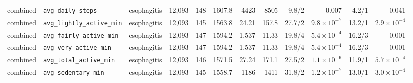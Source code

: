 \documentclass[11pt]{article}
\newcommand{\code}[1]{\texttt{\small #1}}
\begin{document}
\begin{longtable}{@{}p{1.4cm}p{2.9cm}p{1.7cm}rrrr rrrr r@{}}
combined & \code{avg\_daily\_steps} & esophagitis & 12{,}093 & 148 & 1607.8 &  4423 &  8505 & 9.8/2 & 0.007 & 4.2/1 & 0.041 \\
combined & \code{avg\_lightly\_active\_min} & esophagitis & 12{,}093 & 145 & 1563.8 & 24.21 & 157.8 & 27.7/2 & $9.8\times10^{-7}$ & 13.2/1 & $2.9\times10^{-4}$ \\
combined & \code{avg\_fairly\_active\_min} & esophagitis & 12{,}093 & 147 & 1594.2 & 1.537 & 11.33 & 19.8/4 & $5.4\times10^{-4}$ & 16.2/3 & 0.001 \\
combined & \code{avg\_very\_active\_min} & esophagitis & 12{,}093 & 147 & 1594.2 & 1.537 & 11.33 & 19.8/4 & $5.4\times10^{-4}$ & 16.2/3 & 0.001 \\
combined & \code{avg\_total\_active\_min} & esophagitis & 12{,}093 & 146 & 1571.5 & 27.24 & 171.1 & 27.5/2 & $1.1\times10^{-6}$ & 11.9/1 & $5.7\times10^{-4}$ \\
combined & \code{avg\_sedentary\_min} & esophagitis & 12{,}093 & 145 & 1558.7 &  1186 &  1411 & 31.8/2 & $1.2\times10^{-7}$ & 13.0/1 & $3.0\times10^{-4}$ \\
\bottomrule \end{longtable}\normalsize
\end{document}
